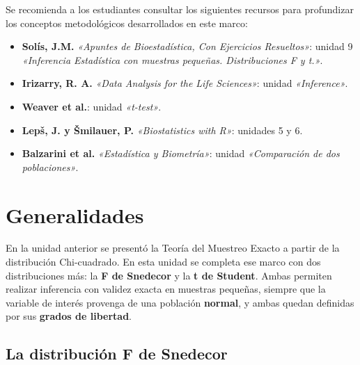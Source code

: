 \documentclass[
  spanish,
  letterpaper,
  DIV=11,
  numbers=noendperiod]{scrreprt}
\providecommand{\tightlist}{%
  \setlength{\itemsep}{0pt}\setlength{\parskip}{0pt}}
\begin{document}
\begin{tcolorbox}[enhanced jigsaw, arc=.35mm, bottomrule=.15mm, bottomtitle=1mm, breakable, colback=white, colbacktitle=quarto-callout-important-color!10!white, colframe=quarto-callout-important-color-frame, coltitle=black, left=2mm, leftrule=.75mm, opacityback=0, opacitybacktitle=0.6, rightrule=.15mm, title=\textcolor{quarto-callout-important-color}{\faExclamation}\hspace{0.5em}{Lectura Sugerida para el Trabajo Práctico}, titlerule=0mm, toprule=.15mm, toptitle=1mm]

Se recomienda a los estudiantes consultar los siguientes recursos para
profundizar los conceptos metodológicos desarrollados en este marco:

\begin{itemize}
\tightlist
\item
  \textbf{Solís, J.M.} \emph{«Apuntes de Bioestadística, Con Ejercicios
  Resueltos»}: unidad 9 \emph{«Inferencia Estadística con muestras
  pequeñas. Distribuciones F y t.»}.
\item
  \textbf{Irizarry, R. A.} \emph{«Data Analysis for the Life Sciences»}:
  unidad \emph{«Inference»}.
\item
  \textbf{Weaver et al.}: unidad \emph{«t-test»}.
\item
  \textbf{Lepš, J. y Šmilauer, P.} \emph{«Biostatistics with R»}:
  unidades 5 y 6.
\item
  \textbf{Balzarini et al.} \emph{«Estadística y Biometría»}: unidad
  \emph{«Comparación de dos poblaciones»}.
\end{itemize}

\end{tcolorbox}

\section{Generalidades}\label{generalidades-5}

En la unidad anterior se presentó la Teoría del Muestreo Exacto a partir
de la distribución Chi-cuadrado. En esta unidad se completa ese marco
con dos distribuciones más: la \textbf{F de Snedecor} y la \textbf{t de
Student}. Ambas permiten realizar inferencia con validez exacta en
muestras pequeñas, siempre que la variable de interés provenga de una
población \textbf{normal}, y ambas quedan definidas por sus
\textbf{grados de libertad}.

\subsection{La distribución F de
Snedecor}\label{la-distribuciuxf3n-f-de-snedecor}
\end{document}
